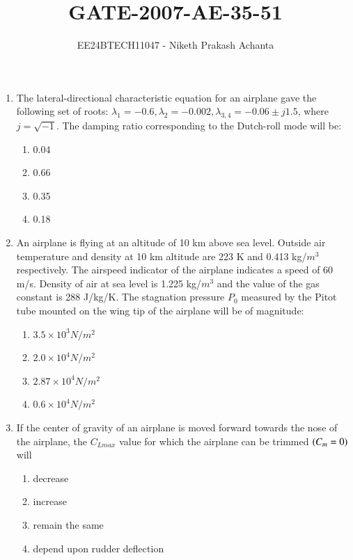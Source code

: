 \documentclass[journal]{IEEEtran}
\renewcommand{\thefigure}{\theenumi}
\renewcommand{\thetable}{\theenumi}
\numberwithin{equation}{enumi}
\numberwithin{figure}{enumi}
\renewcommand{\thetable}{\theenumi}
\begin{document}

\vspace{3cm}

\title{GATE-2007-AE-35-51}
\author{EE24BTECH11047 - Niketh Prakash Achanta}
{\let\newpage\relax\maketitle}
\renewcommand{\thefigure}{\theenumi}
\renewcommand{\thetable}{\theenumi}

\begin{enumerate}[start=35]
    \item The lateral-directional characteristic equation for an airplane gave the following set of roots: $\lambda_1 = -0.6, \lambda_2 = -0.002, \lambda_{3,4} = -0.06 \pm j1.5$, where $j = \sqrt{-1}$. The damping ratio corresponding to the Dutch-roll mode will be:
    \begin{enumerate}
        \item 0.04
        \item 0.66
        \item 0.35
        \item 0.18
    \end{enumerate}

    \item An airplane is flying at an altitude of 10 km above sea level. Outside air temperature and density at 10 km altitude are 223 K and 0.413 kg/$m^3$ respectively. The airspeed indicator of the airplane indicates a speed of 60 m/s. Density of air at sea level is 1.225 kg/$m^3$ and the value of the gas constant  is 288 J/kg/K. The stagnation pressure $P_0$ measured by the Pitot tube mounted on the wing tip of the airplane will be of magnitude:
    \begin{enumerate}
        \item $3.5 \times 10^3 N/m^2$
        \item $2.0 \times 10^4 N/m^2$
        \item $2.87 \times 10^4 N/m^2$
        \item $0.6 \times 10^4 N/m^2$
    \end{enumerate}

    \item If the center of gravity of an airplane is moved forward towards the nose of the airplane, the $C_{Lmax}$  value for which the airplane can be trimmed $\left(C_m = 0\right)$ will
    \begin{enumerate}
        \item decrease
        \item increase
        \item remain the same
        \item depend upon rudder deflection
    \end{enumerate}


\end{enumerate}
\end{document}
